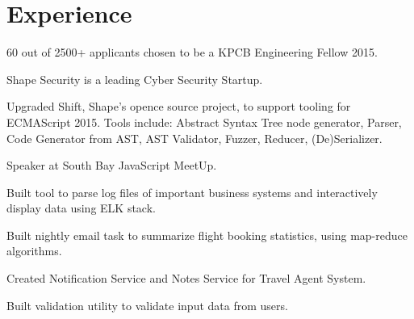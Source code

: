 \documentclass[letterpaper]{deedy-resume} %
\begin{document}
\begin{minipage}[t]{0.66\textwidth} %


\section{Experience}


\vspace{\topsep} %
\begin{tightitemize}
\item 60 out of 2500+ applicants chosen to be a KPCB Engineering Fellow 2015.
\item Shape Security is a leading Cyber Security Startup.
\item Upgraded Shift, Shape's opence source project, to support tooling for ECMAScript 2015. Tools include: Abstract Syntax Tree node generator, Parser, Code Generator from AST, AST Validator, Fuzzer, Reducer, (De)Serializer.
\item Speaker at South Bay JavaScript MeetUp.
\end{tightitemize}

\sectionspace %



\begin{tightitemize}
\item Built tool to parse log files of important business systems and interactively display data using ELK stack.
\item Built nightly email task to summarize flight booking statistics, using map-reduce algorithms.
\item Created Notification Service and Notes Service for Travel Agent System.
\item Built validation utility to validate input data from users.
\end{tightitemize}

\sectionspace %


\end{minipage}
\end{document}

